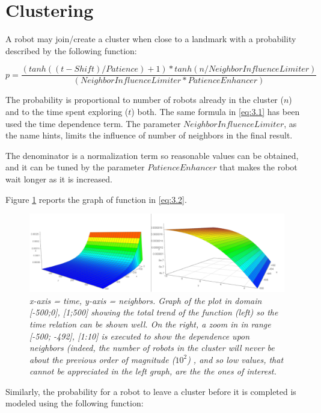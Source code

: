 \section{Clustering}

A robot may join/create a cluster when close to a landmark with a probability described by the following function:

\begin{equation}
    p =  \frac{(tanh((t - Shift) / Patience) + 1) * tanh(n / NeighborInfluenceLimiter)}{(NeighborInfluenceLimiter * PatienceEnhancer)} \tag{3.2}\label{eq:3.2}
\end{equation}

The probability is proportional to number of robots already in the cluster ($n$) and to the time spent exploring ($t$) both. The same formula in \ref{eq:3.1} has been used the time dependence term. 
The parameter $NeighborInfluenceLimiter$, as the name hints, limits the influence of number of neighbors in the final result.

\noindent
The denominator is a normalization term so reasonable values can be obtained, and it can be tuned by the parameter $PatienceEnhancer$ that makes the robot wait longer as it is increased.

\noindent
Figure \ref{fig:cluster-join} reports the graph of function in \ref{eq:3.2}.

\begin{figure}[H]
\centering
\includegraphics[width=\linewidth]{images/cluster_join.png}
\caption{\textit{x-axis = time, y-axis = neighbors. Graph of the plot in domain [-500;0], [1;500]  showing the total trend of the function (left) so the time relation can be shown well. On the right, a zoom in in range [-500; -492], [1:10] is executed to show the dependence upon neighbors (indeed, the number of robots in the cluster will never be about the previous order of magnitude ($10^2$) , and so low values, that cannot be appreciated in the left graph, are the the ones of interest.}}
\label{fig:cluster-join}
\end{figure}

Similarly, the probability for a robot to leave a cluster before it is completed is modeled using the following function:

